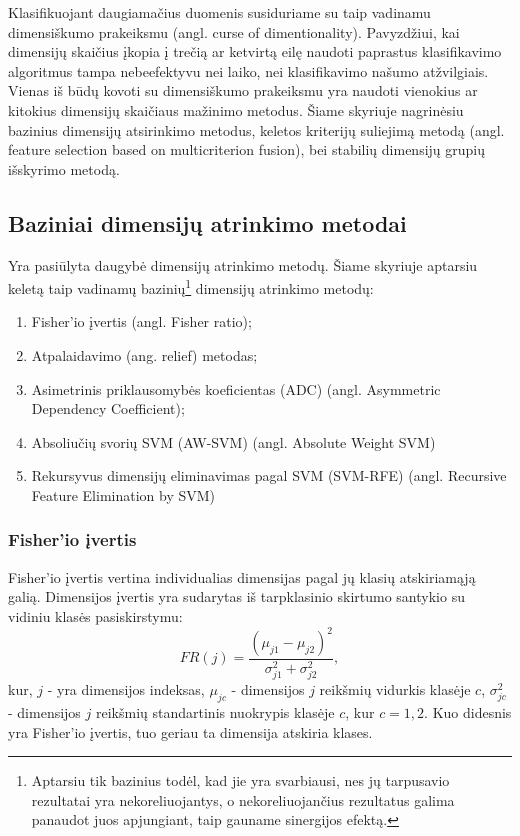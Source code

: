Klasifikuojant daugiamačius duomenis susiduriame su taip vadinamu dimensiškumo
prakeiksmu (angl. curse of dimentionality). Pavyzdžiui, kai dimensijų skaičius įkopia į
trečią ar ketvirtą eilę naudoti paprastus klasifikavimo algoritmus tampa
nebeefektyvu nei laiko, nei klasifikavimo našumo atžvilgiais. Vienas iš būdų
kovoti su dimensiškumo prakeiksmu
yra naudoti vienokius ar kitokius dimensijų skaičiaus mažinimo metodus. Šiame
skyriuje nagrinėsiu bazinius dimensijų atsirinkimo metodus, keletos 
kriterijų suliejimą metodą (angl.
feature selection based on multicriterion fusion)\cite{yang2011robust}, bei
stabilių dimensijų grupių išskyrimo metodą\cite{Loscalzo:2009:CGS:1557019.1557084}.

\subsection{Baziniai dimensijų atrinkimo metodai}

Yra pasiūlyta daugybė dimensijų atrinkimo metodų. Šiame skyriuje aptarsiu
keletą taip vadinamų bazinių\footnote{Aptarsiu tik bazinius todėl, kad jie yra 
svarbiausi, nes jų tarpusavio rezultatai yra nekoreliuojantys, o nekoreliuojančius
rezultatus galima panaudot juos apjungiant, taip gauname sinergijos efektą.}
dimensijų atrinkimo metodų: 
\begin{enumerate}
 \item Fisher'io įvertis (angl. Fisher ratio)\cite{Pavlidis:2001:GFC:369133.369228};
 \item Atpalaidavimo (ang. relief) metodas\cite{DBLP:journals/ml/Robnik-SikonjaK03};
 \item Asimetrinis priklausomybės koeficientas\cite{Shannon:2001:MTC:584091.584093} (ADC) (angl.
 Asymmetric Dependency Coefficient);
 \item Absoliučių svorių SVM\cite{vapnik2000nature} (AW-SVM) (angl. Absolute Weight SVM)
 \item Rekursyvus dimensijų eliminavimas pagal SVM\cite{Guyon:2002:GSC:599613.599671} (SVM-RFE) (angl. Recursive
 Feature Elimination by SVM)
\end{enumerate}

\subsubsection{Fisher'io įvertis}

Fisher'io įvertis vertina individualias dimensijas pagal jų klasių atskiriamąją 
galią. Dimensijos įvertis yra sudarytas iš tarpklasinio skirtumo santykio su 
vidiniu klasės pasiskirstymu:
\begin{equation}
 FR(j) = \frac{(\mu_{j1} - \mu_{j2})^2}{\sigma_{j1}^2 + \sigma_{j2}^2},
\end{equation}
kur, $j$ - yra dimensijos indeksas, $\mu_{jc}$ - dimensijos $j$ reikšmių vidurkis
klasėje $c$, $\sigma_{jc}^2$ - dimensijos $j$ reikšmių standartinis nuokrypis
klasėje $c$, kur $c={1,2}$. Kuo didesnis yra Fisher'io įvertis, tuo geriau ta
dimensija atskiria klases.


